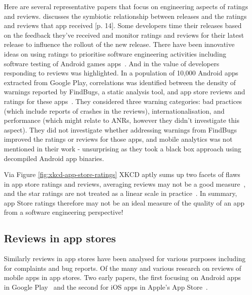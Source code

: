 Here are several representative papers that focus on engineering aspects of ratings and reviews.  \citet{alsubaihin2019app_store_effects_on_software_engineering} discusses the symbiotic relationship between releases and the ratings and reviews that app received [p. 14]. Some developers time their releases based on the feedback they've received and monitor ratings and reviews for their latest release to influence the rollout of the new release. There have been innovative ideas on using ratings to prioritise software engineering activities including software testing of Android games apps~\citep{khalid2014_prioritizing_the_devices_to_test_your_app_on_casestudy_android_games}. And in \citet{greenheld2018_automating_developers_responses_to_app_reviews} the value of developers responding to reviews was highlighted. 
In a population of 10,000 Android apps extracted from Google Play, correlations was identified between the density of warnings reported by FindBugs, a static analysis tool, and app store reviews and ratings for these apps~\citep{khalid2016_examining_the_relationship_between_findbugs_warnings_and_app_ratings}. They considered three warning categories: bad practices (which include reports of crashes in the reviews), internationalisation, and performance (which might relate to ANRs, however they didn't investigate this aspect). They did not investigate whether addressing warnings from FindBugs improved the ratings or reviews for those apps, and mobile analytics was not mentioned in their work - unsurprising as they took a black box approach using decompiled Android app binaries.

Via Figure \ref{fig:xkcd-app-store-ratings} XKCD aptly sums up two facets of flaws in app store ratings and reviews, averaging reviews may not be a good measure~\citep{explainxkcd_937_tornadoguard}, and the star ratings are not treated as a linear scale in practice~\citep{explainxkcd_1098_star_ratings}. In summary, app Store ratings therefore may not be an ideal measure of the quality of an app from a software engineering perspective! 

\subsection{Reviews in app stores}
Similarly reviews in app stores have been analysed for various purposes including for complaints and bug reports. Of the many and various research on reviews of mobile apps in app stores. 
Two early papers, the first focusing on Android apps in Google Play~\citet{fu2013_why_people_hate_your_app_making_sense_of_user_feedback_in_a_mobile_app_store} and the second for iOS apps in Apple's App Store~\citet{khalid2015_what_do_mobile_app_users_complain_about}.


